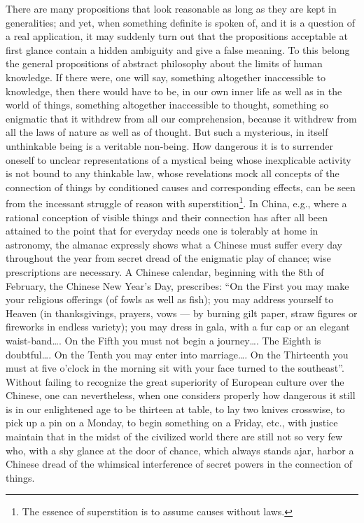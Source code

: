 \documentclass[12pt,a4paper,openany]{book}
\newcommand{\opage}[1]{\marginnote{\footnotesize\textit{[#1]}}}
\begin{document}
There are many propositions that look reasonable
as long as they are kept in generalities; and yet, when
something definite is spoken of, and it is a question of a real
application, it may suddenly turn out that the propositions
acceptable at first glance contain a hidden
ambiguity and give a false meaning. To this belong
the general propositions of abstract philosophy about the limits
of human knowledge. If there were, one will say,
something altogether inaccessible to knowledge, then there would
have to be, in our own inner life as well as in the world of things,
something altogether inaccessible to thought, something
so enigmatic that it withdrew from all our comprehension, because
it withdrew from all the laws of nature as well as of thought.
But such a mysterious, in itself unthinkable
\setcounter{footnote}{0}%
\opage{391}being is a veritable non-being. How dangerous it is to surrender
oneself to unclear representations of a mystical being
whose inexplicable activity is not bound to any
thinkable law, whose revelations mock all concepts
of the connection of things by conditioned causes and
corresponding effects, can be seen from the incessant
struggle of reason with superstition\footnote[1]{The essence of superstition is to assume causes without laws.}. In China, e.g., where a rational
conception of visible things and their connection
has after all been attained to the point that for everyday needs one is tolerably
at home in astronomy, the almanac expressly shows
what a Chinese must suffer every day throughout the year
from secret dread of the enigmatic play of chance; wise
prescriptions are necessary. A Chinese calendar, beginning
with the 8th of February, the Chinese New Year's Day, prescribes:
``On the First you may make your religious offerings
(of fowls as well as fish); you may address
yourself to Heaven (in thanksgivings, prayers, vows --- by
burning gilt paper, straw figures or fireworks in endless
variety); you may dress in gala, with
a fur cap or an elegant waist-band\dots{}. On the Fifth you must
not begin a journey\dots{}. The Eighth is doubtful\dots{}.
On the Tenth you may enter into marriage\dots{}.
On the Thirteenth you must at five o'clock in the morning sit
with your face turned to the southeast''. Without failing to recognize the
great superiority of European culture over the Chinese, one can
nevertheless, when one considers properly how dangerous it still is
in our enlightened age to be thirteen at table, to lay
two knives crosswise, to pick up a pin on a Monday,
to begin something on a Friday, etc., with
\setcounter{footnote}{0}%
\opage{392}justice maintain that in the midst of the civilized world
there are still not so very few who, with a shy glance at
the door of chance, which always stands ajar, harbor
a Chinese dread of the whimsical interference of secret powers
in the connection of things.
\end{document}
